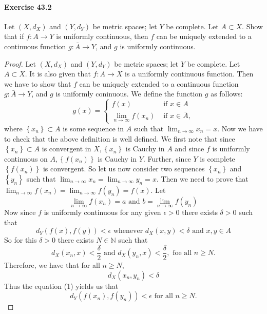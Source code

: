 \documentclass{article}
\begin{document}
\paragraph{Exercise 43.2} Let $(X, d_X)$ and $(Y, d_Y)$ be metric spaces; let $Y$ be complete. Let $A \subset X$. Show that if $f \colon A \rightarrow Y$ is uniformly continuous, then $f$ can be uniquely extended to a continuous function $g \colon \bar{A} \rightarrow Y$, and $g$ is uniformly continuous.
\begin{proof}
    Let $\left(X, d_X\right)$ and $\left(Y, d_Y\right)$ be metric spaces; let $Y$ be complete. Let $A \subset X$. It is also given that $f: A \longrightarrow X$ is a uniformly continuous function. Then we have to show that $f$ can be uniquely extended to a continuous function $g: \bar{A} \longrightarrow Y$, and $g$ is uniformly coninuous.
We define the function $g$ as follows:
$$
g(x)= \begin{cases}f(x) & \text { if } x \in A \\ \lim _{n \rightarrow \infty} f\left(x_n\right) & \text { if } x \in \bar{A},\end{cases}
$$
where $\left\{x_n\right\} \subset A$ is some sequence in $A$ such that $\lim _{n \rightarrow \infty} x_n=x$. Now we have to check that the above definition is well defined. We first note that since $\left\{x_n\right\} \subset A$ is convergent in $X,\left\{x_n\right\}$ is Cauchy in $A$ and since $f$ is uniformly continuous on $A,\left\{f\left(x_n\right)\right\}$ is Cauchy in $Y$. Further, since $Y$ is complete $\left\{f\left(x_n\right)\right\}$ is convergent. So let us now consider two sequences $\left\{x_n\right\}$ and $\left\{y_n\right\}$ such that $\lim _{n \rightarrow \infty} x_n=\lim _{n \rightarrow \infty} y_n=x$. Then we need to prove that $\lim _{n \rightarrow \infty} f\left(x_n\right)=\lim _{n \rightarrow \infty} f\left(y_n\right)=f(x)$. Let
$$
\lim _{n \rightarrow \infty} f\left(x_n\right)=a \text { and } b=\lim _{n \rightarrow \infty} f\left(y_n\right)
$$
Now since $f$ is uniformly continuous for any given $\epsilon>0$ there exists $\delta>0$ such that
$$
d_Y(f(x), f(y))<\epsilon \text { whenever } d_X(x, y)<\delta \text { and } x, y \in A
$$
So for this $\delta>0$ there exists $N \in \mathbb{N}$ such that
$$
d_X\left(x_n, x\right)<\frac{\delta}{2} \text { and } d_X\left(y_n, x\right)<\frac{\delta}{2}, \text { foe all } n \geq N .
$$
Therefore, we have that for all $n \geq N$,
$$
d_X\left(x_n, y_n\right)<\delta
$$
Thus the equation (1) yields us that
$$
d_Y\left(f\left(x_n\right), f\left(y_n\right)\right)<\epsilon \text { for all } n \geq N .
$$
\end{proof}
\end{document}
